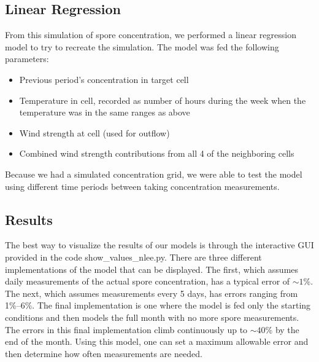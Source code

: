 \documentclass[letterpaper,12pt]{article}
\begin{document}
\subsection{Linear Regression} 

From this simulation of spore concentration, we performed a linear regression model to try to recreate the simulation. The model was fed the following parameters:

\begin{itemize}
\item Previous period's concentration in target cell
\item Temperature in cell, recorded as number of hours during the week when the temperature was in the same ranges as above
\item Wind strength at cell (used for outflow)
\item Combined wind strength contributions from all 4 of the neighboring cells
\end{itemize}

Because we had a simulated concentration grid, we were able to test the model using different time periods between taking concentration measurements. 

\subsection{Results}

The best way to visualize the results of our models is through the interactive GUI provided in the code show\_values\_nlee.py.  There are three different implementations of the model that can be displayed.  The first, which assumes daily measurements of the actual spore concentration, has a typical error of $\sim 1$\%. The next, which assumes measurements every 5 days, has errors ranging from 1\%--6\%.  The final implementation is one where the model is fed only the starting conditions and then models the full month with no more spore measurements.  The errors in this final implementation climb continuously up to $\sim 40$\% by the end of the month.  Using this model, one can set a maximum allowable error and then determine how often measurements are needed. 





\end{document}
